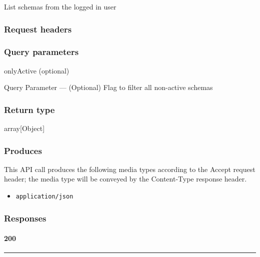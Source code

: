 List schemas from the logged in user

\hypertarget{request-headers-43}{%
\subsubsection{Request headers}\label{request-headers-43}}

\hypertarget{query-parameters-2}{%
\subsubsection{Query parameters}\label{query-parameters-2}}

onlyActive (optional)

{Query Parameter} --- (Optional) Flag to filter all non-active schemas

\hypertarget{return-type-62}{%
\subsubsection{Return type}\label{return-type-62}}

array{[}Object{]}

\hypertarget{produces-76}{%
\subsubsection{Produces}\label{produces-76}}

This API call produces the following media types according to the
{Accept} request header; the media type will be conveyed by the
{Content-Type} response header.

\begin{itemize}
\tightlist
\item
  \texttt{application/json}
\end{itemize}

\hypertarget{responses-76}{%
\subsubsection{Responses}\label{responses-76}}

\hypertarget{section-252}{%
\paragraph{200}\label{section-252}}

\begin{center}\rule{0.5\linewidth}{\linethickness}\end{center}

